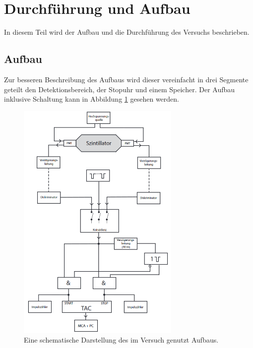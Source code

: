 \newpage
\section{Durchführung und Aufbau}
\label{sec:durchfuerung}
In diesem Teil wird der Aufbau und die Durchführung des Versuchs beschrieben.
\FloatBarrier
\subsection{Aufbau}
Zur besseren Beschreibung des Aufbaus wird dieser vereinfacht in drei Segmente geteilt den Detektionsbereich, der Stopuhr und einem Speicher.
Der Aufbau inklusive Schaltung kann in Abbildung \ref{fig:aufbau} gesehen werden.
\begin{figure}
    \centering
    \includegraphics[width=0.7\textwidth]{data/aufbau.png}
    \caption{Eine schematische Darstellung des im Versuch genutzt Aufbaus. \cite{V01}}
    \label{fig:aufbau}
\end{figure}
\FloatBarrier
